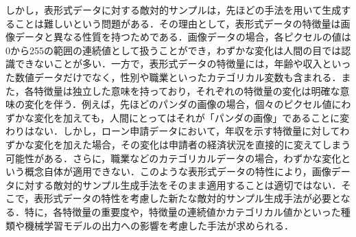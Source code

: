 しかし，表形式データに対する敵対的サンプルは，先ほどの手法を用いて生成することは難しいという問題がある．その理由として，表形式データの特徴量は画像データと異なる性質を持つためである．画像データの場合，各ピクセルの値は0から255の範囲の連続値として扱うことができ，わずかな変化は人間の目では認識できないことが多い．一方で，表形式データの特徴量には，年齢や収入といった数値データだけでなく，性別や職業といったカテゴリカル変数も含まれる．また，各特徴量は独立した意味を持っており，それぞれの特徴量の変化は明確な意味の変化を伴う．例えば，先ほどのパンダの画像の場合，個々のピクセル値にわずかな変化を加えても，人間にとってはそれが「パンダの画像」であることに変わりはない．しかし，ローン申請データにおいて，年収を示す特徴量に対してわずかな変化を加えた場合，その変化は申請者の経済状況を直接的に変えてしまう可能性がある．さらに，職業などのカテゴリカルデータの場合，わずかな変化という概念自体が適用できない．このような表形式データの特性により，画像データに対する敵対的サンプル生成手法をそのまま適用することは適切ではない．そこで，表形式データの特性を考慮した新たな敵対的サンプル生成手法が必要となる．特に，各特徴量の重要度や，特徴量の連続値かカテゴリカル値かといった種類や機械学習モデルの出力への影響を考慮した手法が求められる．


